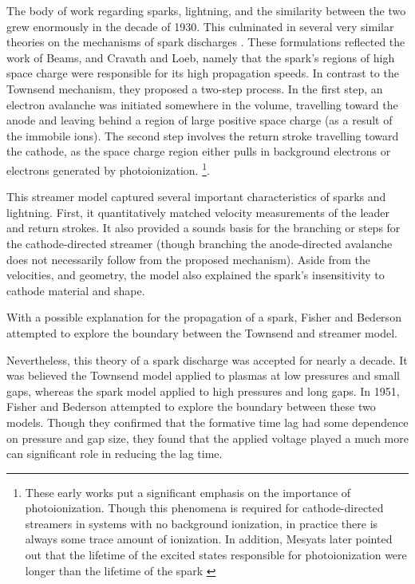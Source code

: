 The body of work regarding sparks, lightning, and the similarity between the two
grew enormously in the decade of 1930. This culminated in several very similar
theories on the mechanisms of spark discharges \cite{Flegler1936, Loeb1940,
Loeb1940a, Meek1940}. These formulations reflected the work of Beams, and
Cravath and Loeb, namely that the spark's regions of high space charge were
responsible for its high propagation speeds. In contrast to the Townsend
mechanism, they proposed a two-step process. In the first step, an electron
avalanche was initiated somewhere in the volume, travelling toward the anode and
leaving behind a region of large positive space charge (as a result of the
immobile ions). The second step involves the return stroke travelling toward the
cathode, as the space charge region either pulls in background electrons or
electrons generated by photoionization. \footnote{These early works put a
significant emphasis on the importance of photoionization. Though this phenomena
is required for cathode-directed streamers in systems with no background
ionization, in practice there is always some trace amount of ionization. In
addition, Mesyats later pointed out that the lifetime of the excited states
responsible for photoionization were longer than the lifetime of the spark
\cite{Mesyats1972}}.

This streamer model captured several important characteristics of sparks and
lightning. First, it quantitatively matched velocity measurements of the leader
and return strokes. It also provided a sounds basis for the branching or steps
for the cathode-directed streamer (though branching the anode-directed avalanche
does not necessarily follow from the proposed mechanism). Aside from the
velocities, and geometry, the model also explained the spark's insensitivity to
cathode material and shape. 

With a possible explanation for the propagation of a spark, Fisher and Bederson
attempted to explore the boundary between the Townsend and streamer model. 

Nevertheless, this theory of a spark discharge was accepted for nearly a decade.
It was believed the Townsend model applied to plasmas at low pressures and small
gaps, whereas the spark model applied to high pressures and long gaps. In 1951,
Fisher and Bederson attempted to explore the boundary between these two models.
Though they confirmed that the formative time lag had some dependence on
pressure and gap size, they found that the applied voltage played a much more
 can significant role in reducing the lag time.

